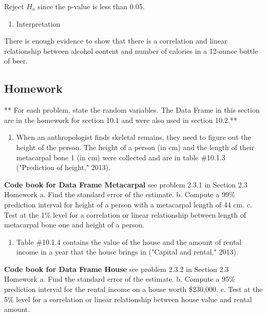 \documentclass[]{book}
\providecommand{\tightlist}{%
  \setlength{\itemsep}{0pt}\setlength{\parskip}{0pt}}
\begin{document}
Reject \(H_o\) since the p-value is less than 0.05.

\begin{enumerate}
\def\labelenumi{\arabic{enumi}.}
\setcounter{enumi}{5}
\tightlist
\item
  Interpretation
\end{enumerate}

There is enough evidence to show that there is a correlation and linear relationship between alcohol content and number of calories in a 12-ounce bottle of beer.

\hypertarget{homework-31}{%
\subsection{Homework}\label{homework-31}}

** For each problem, state the random variables. The Data Frame in this section are in the homework for section 10.1 and were also used in section 10.2.**

\begin{enumerate}
\def\labelenumi{\arabic{enumi}.}
\tightlist
\item
  When an anthropologist finds skeletal remains, they need to figure out the height of the person. The height of a person (in cm) and the length of their metacarpal bone 1 (in cm) were collected and are in table \#10.1.3 ("Prediction of height," 2013).
\end{enumerate}

\textbf{Code book for Data Frame Metacarpal} see problem 2.3.1 in Section 2.3 Homework
a. Find the standard error of the estimate.
b. Compute a 99\% prediction interval for height of a person with a metacarpal length of 44 cm.
c. Test at the 1\% level for a correlation or linear relationship between length of metacarpal bone one and height of a person.

\begin{enumerate}
\def\labelenumi{\arabic{enumi}.}
\setcounter{enumi}{1}
\tightlist
\item
  Table \#10.1.4 contains the value of the house and the amount of rental income in a year that the house brings in ("Capital and rental," 2013).
\end{enumerate}

\textbf{Code book for Data Frame House} see problem 2.3.2 in Section 2.3 Homework
a. Find the standard error of the estimate.
b. Compute a 95\% prediction interval for the rental income on a house worth \$230,000.
c. Test at the 5\% level for a correlation or linear relationship between house value and rental amount.
\end{document}

